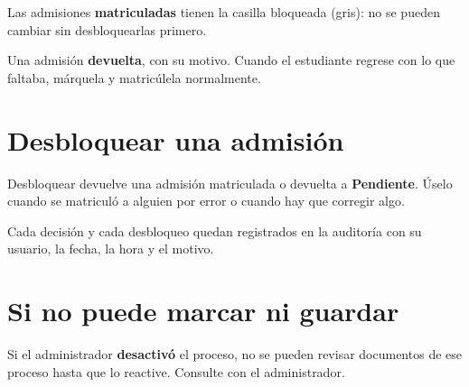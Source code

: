 \begin{leyenda}
  \item[1] Las admisiones \textbf{matriculadas} tienen la casilla bloqueada (gris): no se
        pueden cambiar sin desbloquearlas primero.
  \item[2] Una admisión \textbf{devuelta}, con su motivo. Cuando el estudiante regrese con lo
        que faltaba, márquela y matricúlela normalmente.
\end{leyenda}

\section{Desbloquear una admisión}\label{sec:desbloquear}

Desbloquear devuelve una admisión matriculada o devuelta a \textbf{Pendiente}. Úselo cuando se
matriculó a alguien por error o cuando hay que corregir algo.

\begin{pasos}
\end{pasos}

\begin{nota}
Cada decisión y cada desbloqueo quedan registrados en la auditoría con su usuario, la fecha, la
hora y el motivo.
\end{nota}

\section{Si no puede marcar ni guardar}

Si el administrador \textbf{desactivó} el proceso, no se pueden revisar documentos de ese
proceso hasta que lo reactive. Consulte con el administrador.
